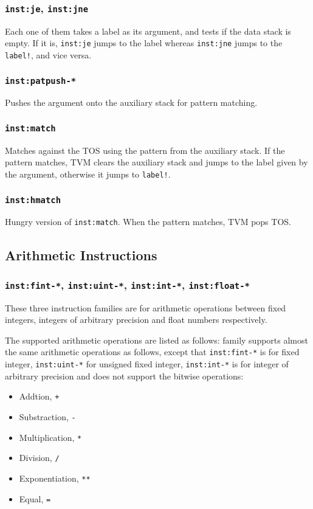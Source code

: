 \documentclass{article}
\newcommand{\inst}[1] {\texttt{inst:#1}}
\begin{document}
\subsubsection{\inst{je}, \inst{jne}}

Each one of them takes a label as its argument, and tests if the data stack is empty. If it is, \inst{je} jumps to the label whereas \inst{jne} jumps to the \texttt{label!}, and vice versa.

\subsubsection{\inst{patpush-*}}

Pushes the argument onto the auxiliary stack for pattern matching.

\subsubsection{\inst{match}}

Matches against the TOS using the pattern from the auxiliary stack. If the pattern matches, TVM clears the auxiliary stack and jumps to the label given by the argument, otherwise it jumps to \texttt{label!}.

\subsubsection{\inst{hmatch}}

Hungry version of \inst{match}. When the pattern matches, TVM pops TOS.

\subsection{Arithmetic Instructions}

\subsubsection{\inst{fint-*}, \inst{uint-*}, \inst{int-*}, \inst{float-*}}

These three instruction families are for arithmetic operations between fixed integers, integers of arbitrary precision and float numbers respectively.

The supported arithmetic operations are listed as follows:
family supports almost the same arithmetic operations as follows, except that \inst{fint-*} is for fixed integer, \inst{uint-*} for unsigned fixed integer, \inst{int-*} is for integer of arbitrary precision and does not support the bitwise operations:
\begin{itemize}
\item Addtion, \texttt{+}
\item Substraction, \texttt{-}
\item Multiplication, \texttt{*}
\item Division, \texttt{/}
\item Exponentiation, \texttt{**}
\item Equal, \texttt{=}
\end{itemize}
\end{document}
